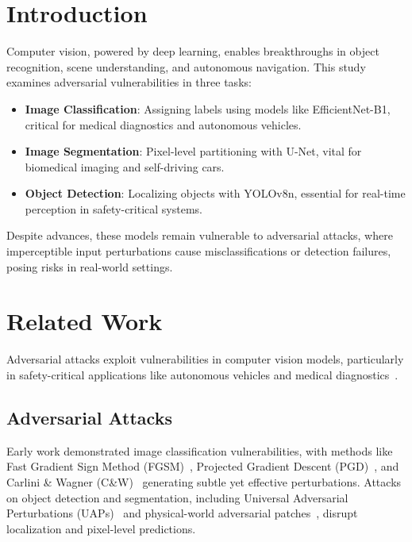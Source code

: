 \documentclass[conference]{IEEEtran}
\begin{document}
\section{Introduction}
Computer vision, powered by deep learning, enables breakthroughs in object recognition, scene understanding, and autonomous navigation. This study examines adversarial vulnerabilities in three tasks:
\begin{itemize}
    \item \textbf{Image Classification}: Assigning labels using models like EfficientNet-B1, critical for medical diagnostics and autonomous vehicles.
    \item \textbf{Image Segmentation}: Pixel-level partitioning with U-Net, vital for biomedical imaging and self-driving cars.
    \item \textbf{Object Detection}: Localizing objects with YOLOv8n, essential for real-time perception in safety-critical systems.
\end{itemize}
Despite advances, these models remain vulnerable to adversarial attacks, where imperceptible input perturbations cause misclassifications or detection failures, posing risks in real-world settings.

\section{Related Work}
Adversarial attacks exploit vulnerabilities in computer vision models, particularly in safety-critical applications like autonomous vehicles and medical diagnostics~\cite{szegedy2014intriguingpropertiesneuralnetworks, goodfellow2015explaining}.

\subsection{Adversarial Attacks}
Early work demonstrated image classification vulnerabilities, with methods like Fast Gradient Sign Method (FGSM)~\cite{goodfellow2015explaining}, Projected Gradient Descent (PGD)~\cite{madry2018towardspgd}, and Carlini \& Wagner (C\&W)~\cite{carlini2017evaluatingrobustnessneuralnetworks} generating subtle yet effective perturbations. Attacks on object detection and segmentation, including Universal Adversarial Perturbations (UAPs)~\cite{moosavi2017universal} and physical-world adversarial patches~\cite{3d_physical_attacks}, disrupt localization and pixel-level predictions.
\end{document}

